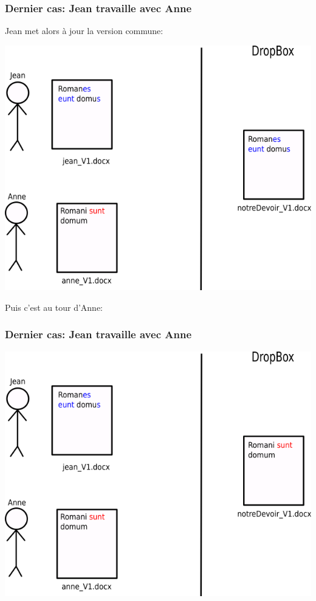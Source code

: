\documentclass{beamer}
\begin{document}
\begin{frame}
\frametitle{Dernier cas: Jean travaille avec Anne}
Jean met alors à jour la version commune:
\begin{center}
    \includegraphics[scale=0.4]{images/lastScenario/lastScenario_conflict2.png}
\end{center}
\end{frame}

\begin{frame}
Puis c'est au tour d'Anne:
\frametitle{Dernier cas: Jean travaille avec Anne}
\begin{center}
    \includegraphics[scale=0.4]{images/lastScenario/lastScenario_conflict3.png}
\end{center}
\end{frame}
\end{document}
